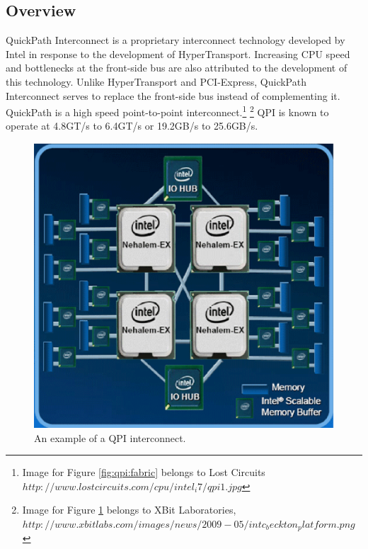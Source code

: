 \documentclass[conference]{IEEEtran}
\begin{document}
\subsection{Overview}
QuickPath Interconnect is a proprietary interconnect technology developed by
Intel in response to the development of HyperTransport. Increasing
CPU speed and bottlenecks at the front-side bus are also attributed to the
development of this technology. Unlike HyperTransport and PCI-Express, QuickPath
Interconnect serves to replace the front-side bus instead of complementing it.
QuickPath is a high speed point-to-point
interconnect\cite{intelQPIintro}.\footnote{Image for Figure \ref{fig:qpi:fabric} belongs to Lost Circuits 
\\$http://www.lostcircuits.com/cpu/intel_i7/qpi1.jpg$}
\footnote{Image for
Figure \ref{fig:qpi:diagram} belongs to XBit Laboratories,
\\$http://www.xbitlabs.com/images/news/2009-05/intc_beckton_platform.png$}
QPI is known to operate at 4.8GT/s to 6.4GT/s or 19.2GB/s to 25.6GB/s. 
\begin{figure}[!t]
	\begin{center}
		\includegraphics[scale=.35]{qpiDiagram}
	\end{center}
	\caption{An example of a QPI interconnect.}
	\label{fig:qpi:diagram}
\end{figure}
\end{document}
